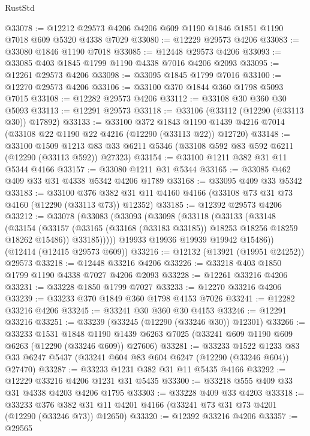 \begin{lexlean}{RustStd}
\begin{coremodule}
{\begin{coremodule}
{{{{{{{{{{{{{{{{{{{{{{{{{{{{{{{{{{{{{{{{{{{{{{{{{{@33078 := @12212 @29573 @4206 @4206 @609 @1190 @1846 @1851 @1190 @7018 @609 @5320 @4338 @7029
@33080 := @12229 @29573 @4206
@33083 := @33080 @1846 @1190 @7018
@33085 := @12448 @29573 @4206
@33093 := @33085 @403 @1845 @1799 @1190 @4338 @7016 @4206 @2093
@33095 := @12261 @29573 @4206
@33098 := @33095 @1845 @1799 @7016
@33100 := @12270 @29573 @4206
@33106 := @33100 @370 @1844 @360 @1798 @5093 @7015
@33108 := @12282 @29573 @4206
@33112 := @33108 @30 @360 @30 @5093
@33113 := @12291 @29573
@33118 := @33106 (@33112 (@12290 (@33113 @30)) @17892)
@33133 := @33100
    @372
    @1843
    @1190
    @1439
    @4216
    @7014
    (@33108 @22 @1190 @22 @4216 (@12290 (@33113 @22)) @12720)
@33148 := @33100
    @1509
    @1213
    @83
    @33
    @6211
    @5346
    (@33108 @592 @83 @592 @6211 (@12290 (@33113 @592)) @27323)
@33154 := @33100 @1211 @382 @31 @11 @5344 @4166
@33157 := @33080 @1211 @31 @5344
@33165 := @33085 @462 @409 @33 @31 @4338 @5342 @4206 @1789
@33168 := @33095 @409 @33 @5342
@33183 := @33100
    @376
    @382
    @31
    @11
    @4160
    @4166
    (@33108 @73 @31 @73 @4160 (@12290 (@33113 @73)) @12352)
@33185 := @12392 @29573 @4206
@33212 := @33078
    (@33083
      (@33093
        (@33098
          (@33118
            (@33133
              (@33148
                (@33154
                  (@33157 (@33165 (@33168 (@33183 @33185)) @18253 @18256 @18259 @18262 @15486))
                  @33185)))))
        @19933
        @19936
        @19939
        @19942
        @15486))
    (@12414 (@12415 @29573 @609))
@33216 := @12132 (@13921 (@19951 @24252)) @29573
@33218 := @12448 @33216 @4206
@33226 := @33218 @403 @1850 @1799 @1190 @4338 @7027 @4206 @2093
@33228 := @12261 @33216 @4206
@33231 := @33228 @1850 @1799 @7027
@33233 := @12270 @33216 @4206
@33239 := @33233 @370 @1849 @360 @1798 @4153 @7026
@33241 := @12282 @33216 @4206
@33245 := @33241 @30 @360 @30 @4153
@33246 := @12291 @33216
@33251 := @33239 (@33245 (@12290 (@33246 @30)) @12301)
@33266 := @33233
    @1531
    @1848
    @1190
    @1439
    @6263
    @7025
    (@33241 @609 @1190 @609 @6263 (@12290 (@33246 @609)) @27606)
@33281 := @33233
    @1522
    @1233
    @83
    @33
    @6247
    @5437
    (@33241 @604 @83 @604 @6247 (@12290 (@33246 @604)) @27470)
@33287 := @33233 @1231 @382 @31 @11 @5435 @4166
@33292 := @12229 @33216 @4206 @1231 @31 @5435
@33300 := @33218 @555 @409 @33 @31 @4338 @4203 @4206 @1795
@33303 := @33228 @409 @33 @4203
@33318 := @33233
    @376
    @382
    @31
    @11
    @4201
    @4166
    (@33241 @73 @31 @73 @4201 (@12290 (@33246 @73)) @12650)
@33320 := @12392 @33216 @4206
@33357 := @29565
}}}}}}}}}}}}}}}}}}}}}}}}}}}}}}}}}}}}}}}}}}}}}}}}}}
\end{coremodule}}
\end{coremodule}
\end{lexlean}
